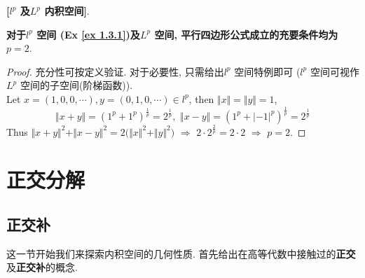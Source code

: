 	\vspace{6em}
	
	\begin{example}\label{ex 3.2.1}
		\textbf{[$l^p$ 及$L^p$ 内积空间]}. 
		\begin{center}
			\textbf{对于$l^p$ 空间 (Ex \ref{ex 1.3.1})及$L^p$ 空间, 平行四边形公式成立的充要条件均为$p = 2$}.
		\end{center}
		
		\vspace{2em}
		
		\begin{proof}
			充分性可按定义验证. 对于必要性, 只需给出$l^p$ 空间特例即可 ($l^p$ 空间可视作$L^p$ 空间的子空间(阶梯函数)). \\
			Let $x = (1 , 0 , 0 , \cdots) , y = (0 , 1 , 0 , \cdots) \in l^p$, then $\Vert x \Vert = \Vert y \Vert = 1$, 
			\[ \Vert x + y \Vert = \left( 1^p + 1^p \right)^{\tfrac{1}{p}} = 2^{\tfrac{1}{p}} , \,\, \Vert x - y \Vert = \left( 1^p + \left| -1 \right|^p \right)^{\tfrac{1}{p}} = 2^{\tfrac{1}{p}} \]
			Thus $\Vert x + y \Vert^2 + \Vert x - y \Vert^2 = 2 \Big( \Vert x \Vert^2 + \Vert y \Vert^2 \Big) \,\, \Rightarrow \,\, 2 \cdot 2^{\tfrac{2}{p}} = 2 \cdot 2 \,\, \Rightarrow \,\, p = 2$. 
		\end{proof}
	\end{example}

\newpage

\section{正交分解}
\subsection{正交补}
	这一节开始我们来探索内积空间的几何性质. 首先给出在高等代数中接触过的\textbf{正交}及\textbf{正交补}的概念. 
	
	\vspace{1em}
	
